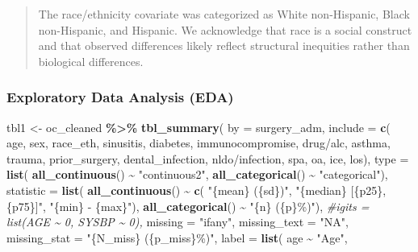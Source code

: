 \documentclass[
]{article}
\newenvironment{Shaded}{\begin{snugshade}}{\end{snugshade}}
\newcommand{\AttributeTok}[1]{\textcolor[rgb]{0.13,0.29,0.53}{#1}}
\newcommand{\CommentTok}[1]{\textcolor[rgb]{0.56,0.35,0.01}{\textit{#1}}}
\newcommand{\FunctionTok}[1]{\textcolor[rgb]{0.13,0.29,0.53}{\textbf{#1}}}
\newcommand{\NormalTok}[1]{#1}
\newcommand{\OtherTok}[1]{\textcolor[rgb]{0.56,0.35,0.01}{#1}}
\newcommand{\SpecialCharTok}[1]{\textcolor[rgb]{0.81,0.36,0.00}{\textbf{#1}}}
\newcommand{\StringTok}[1]{\textcolor[rgb]{0.31,0.60,0.02}{#1}}
\begin{document}
\begin{quote}
The race/ethnicity covariate was categorized as White non-Hispanic, Black non-Hispanic, and Hispanic. We acknowledge that race is a social construct and that observed differences likely reflect structural inequities rather than biological differences.
\end{quote}

\subsubsection{Exploratory Data Analysis (EDA)}\label{exploratory-data-analysis-eda}

\begin{Shaded}
\begin{Highlighting}[]
\NormalTok{tbl1 }\OtherTok{\textless{}{-}}\NormalTok{ oc\_cleaned }\SpecialCharTok{\%\textgreater{}\%}
  \FunctionTok{tbl\_summary}\NormalTok{(}
    \AttributeTok{by =}\NormalTok{ surgery\_adm,}
    \AttributeTok{include =} \FunctionTok{c}\NormalTok{(}
\NormalTok{      age, sex, race\_eth, sinusitis, diabetes, immunocompromise, }\StringTok{\textasciigrave{}}\AttributeTok{drug/alc}\StringTok{\textasciigrave{}}\NormalTok{,}
\NormalTok{      asthma, trauma, prior\_surgery, dental\_infection, }\StringTok{\textasciigrave{}}\AttributeTok{nldo/infection}\StringTok{\textasciigrave{}}\NormalTok{, }
\NormalTok{      spa, oa, ice, los),}
    \AttributeTok{type =} \FunctionTok{list}\NormalTok{(}
      \FunctionTok{all\_continuous}\NormalTok{() }\SpecialCharTok{\textasciitilde{}} \StringTok{"continuous2"}\NormalTok{,}
      \FunctionTok{all\_categorical}\NormalTok{() }\SpecialCharTok{\textasciitilde{}} \StringTok{"categorical"}\NormalTok{),}
    \AttributeTok{statistic =} \FunctionTok{list}\NormalTok{(}
      \FunctionTok{all\_continuous}\NormalTok{() }\SpecialCharTok{\textasciitilde{}} \FunctionTok{c}\NormalTok{(}
        \StringTok{"\{mean\} (\{sd\})"}\NormalTok{,}
        \StringTok{"\{median\} [\{p25\}, \{p75\}]"}\NormalTok{,}
        \StringTok{"\{min\} {-} \{max\}"}\NormalTok{),}
      \FunctionTok{all\_categorical}\NormalTok{() }\SpecialCharTok{\textasciitilde{}} \StringTok{"\{n\} (\{p\}\%)"}\NormalTok{),}
    \CommentTok{\#igits = list(AGE \textasciitilde{} 0, SYSBP \textasciitilde{} 0),}
    \AttributeTok{missing =} \StringTok{"ifany"}\NormalTok{,}
    \AttributeTok{missing\_text =} \StringTok{"NA"}\NormalTok{,}
    \AttributeTok{missing\_stat =} \StringTok{"\{N\_miss\} (\{p\_miss\}\%)"}\NormalTok{,}
    \AttributeTok{label =} \FunctionTok{list}\NormalTok{(}
\NormalTok{      age }\SpecialCharTok{\textasciitilde{}} \StringTok{"Age"}\NormalTok{,}

\end{Highlighting}
\end{Shaded}
\end{document}
